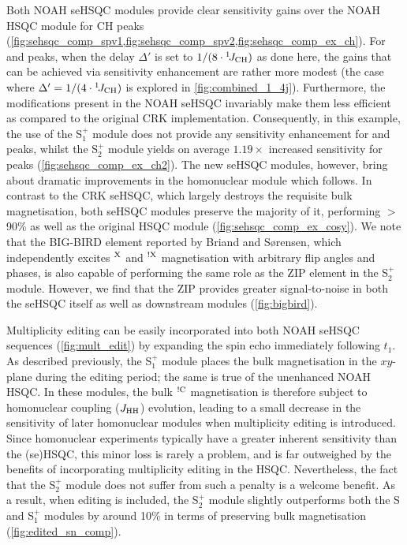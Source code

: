 \documentclass[11pt]{article}
\newcommand*{\noahS}{S}
\newcommand*{\noahSpa}{S$^+_1$}
\newcommand*{\noahSpb}{S$^+_2$}
\newcommand*{\onejch}{{}^{1}\!J_{\ce{CH}}}
\newcommand*{\magn}[1]{\ce{^1H}$^{#1}$}
\newcommand*{\magnnot}[1]{\ce{^1H}$^{!#1}$}
\newcommand*{\jhh}{J_{\ce{HH}}}
\begin{document}
Both NOAH seHSQC modules provide clear sensitivity gains over the NOAH HSQC module for CH peaks (\cref{fig:sehsqc_comp_spv1,fig:sehsqc_comp_spv2,fig:sehsqc_comp_ex_ch}).
For  and  peaks, when the delay $\Delta'$ is set to $1/(8 \cdot \onejch)$ as done here, the gains that can be achieved via sensitivity enhancement are rather more modest (the case where $\Delta' = 1/(4\cdot\onejch)$ is explored in \cref{fig:combined_1_4j}).\autocite{Schleucher1994JBNMR}
Furthermore, the modifications present in the NOAH seHSQC invariably make them less efficient as compared to the original CRK implementation.
Consequently, in this example, the use of the \noahSpa{} module does not provide any sensitivity enhancement for  and  peaks, whilst the \noahSpb{} module yields on average $1.19\times$ increased sensitivity for  peaks (\cref{fig:sehsqc_comp_ex_ch2}).
The new seHSQC modules, however, bring about dramatic improvements in the homonuclear module which follows.
In contrast to the CRK seHSQC, which largely destroys the requisite bulk magnetisation, both seHSQC modules preserve the majority of it, performing $>$90\% as well as the original HSQC module (\cref{fig:sehsqc_comp_ex_cosy}).
We note that the BIG-BIRD element reported by Briand and S{\o}rensen\autocite{Briand1997JMR}, which independently excites \magn{\ce{X}} and \magnnot{\ce{X}} magnetisation with arbitrary flip angles and phases, is also capable of performing the same role as the ZIP element in the \noahSpb{} module.
However, we find that the ZIP provides greater signal-to-noise in both the seHSQC itself as well as downstream modules (\cref{fig:bigbird}).

Multiplicity editing can be easily incorporated into both NOAH seHSQC sequences (\cref{fig:mult_edit}) by expanding the spin echo immediately following $t_1$.
As described previously, the \noahSpa{} module places the bulk magnetisation in the $xy$-plane during the editing period; the same is true of the unenhanced NOAH HSQC.
In these modules, the bulk \magnnot{\ce{C}} magnetisation is therefore subject to homonuclear coupling ($\jhh$) evolution, leading to a small decrease in the sensitivity of later homonuclear modules when multiplicity editing is introduced.
Since homonuclear experiments typically have a greater inherent sensitivity than the (se)HSQC, this minor loss is rarely a problem, and is far outweighed by the benefits of incorporating multiplicity editing in the HSQC.
Nevertheless, the fact that the \noahSpb{} module does not suffer from such a penalty is a welcome benefit.
As a result, when editing is included, the \noahSpb{} module slightly outperforms both the \noahS{} and \noahSpa{} modules by around 10\% in terms of preserving bulk magnetisation (\cref{fig:edited_sn_comp}).
\end{document}
